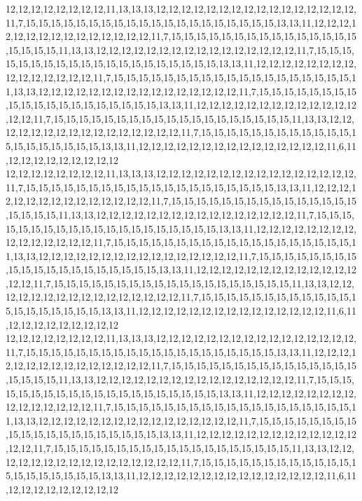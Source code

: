 12,12,12,12,12,12,12,12,11,13,13,13,12,12,12,12,12,12,12,12,12,12,12,12,12,12,12,12,11,7,15,15,15,15,15,15,15,15,15,15,15,15,15,15,15,15,15,15,15,15,13,13,11,12,12,12,12,12,12,12,12,12,12,12,12,12,12,12,11,7,15,15,15,15,15,15,15,15,15,15,15,15,15,15,15,15,15,15,15,11,13,13,12,12,12,12,12,12,12,12,12,12,12,12,12,12,12,12,11,7,15,15,15,15,15,15,15,15,15,15,15,15,15,15,15,15,15,15,15,15,13,13,11,12,12,12,12,12,12,12,12,12,12,12,12,12,12,12,11,7,15,15,15,15,15,15,15,15,15,15,15,15,15,15,15,15,15,15,15,11,13,13,12,12,12,12,12,12,12,12,12,12,12,12,12,12,12,12,11,7,15,15,15,15,15,15,15,15,15,15,15,15,15,15,15,15,15,15,15,15,13,13,11,12,12,12,12,12,12,12,12,12,12,12,12,12,12,12,11,7,15,15,15,15,15,15,15,15,15,15,15,15,15,15,15,15,15,15,15,11,13,13,12,12,12,12,12,12,12,12,12,12,12,12,12,12,12,12,11,7,15,15,15,15,15,15,15,15,15,15,15,15,15,15,15,15,15,15,15,15,13,13,11,12,12,12,12,12,12,12,12,12,12,12,12,12,12,12,11,6,11,12,12,12,12,12,12,12,12,12
12,12,12,12,12,12,12,12,11,13,13,13,12,12,12,12,12,12,12,12,12,12,12,12,12,12,12,12,11,7,15,15,15,15,15,15,15,15,15,15,15,15,15,15,15,15,15,15,15,15,13,13,11,12,12,12,12,12,12,12,12,12,12,12,12,12,12,12,11,7,15,15,15,15,15,15,15,15,15,15,15,15,15,15,15,15,15,15,15,11,13,13,12,12,12,12,12,12,12,12,12,12,12,12,12,12,12,12,11,7,15,15,15,15,15,15,15,15,15,15,15,15,15,15,15,15,15,15,15,15,13,13,11,12,12,12,12,12,12,12,12,12,12,12,12,12,12,12,11,7,15,15,15,15,15,15,15,15,15,15,15,15,15,15,15,15,15,15,15,11,13,13,12,12,12,12,12,12,12,12,12,12,12,12,12,12,12,12,11,7,15,15,15,15,15,15,15,15,15,15,15,15,15,15,15,15,15,15,15,15,13,13,11,12,12,12,12,12,12,12,12,12,12,12,12,12,12,12,11,7,15,15,15,15,15,15,15,15,15,15,15,15,15,15,15,15,15,15,15,11,13,13,12,12,12,12,12,12,12,12,12,12,12,12,12,12,12,12,11,7,15,15,15,15,15,15,15,15,15,15,15,15,15,15,15,15,15,15,15,15,13,13,11,12,12,12,12,12,12,12,12,12,12,12,12,12,12,12,11,6,11,12,12,12,12,12,12,12,12,12
12,12,12,12,12,12,12,12,11,13,13,13,12,12,12,12,12,12,12,12,12,12,12,12,12,12,12,12,11,7,15,15,15,15,15,15,15,15,15,15,15,15,15,15,15,15,15,15,15,15,13,13,11,12,12,12,12,12,12,12,12,12,12,12,12,12,12,12,11,7,15,15,15,15,15,15,15,15,15,15,15,15,15,15,15,15,15,15,15,11,13,13,12,12,12,12,12,12,12,12,12,12,12,12,12,12,12,12,11,7,15,15,15,15,15,15,15,15,15,15,15,15,15,15,15,15,15,15,15,15,13,13,11,12,12,12,12,12,12,12,12,12,12,12,12,12,12,12,11,7,15,15,15,15,15,15,15,15,15,15,15,15,15,15,15,15,15,15,15,11,13,13,12,12,12,12,12,12,12,12,12,12,12,12,12,12,12,12,11,7,15,15,15,15,15,15,15,15,15,15,15,15,15,15,15,15,15,15,15,15,13,13,11,12,12,12,12,12,12,12,12,12,12,12,12,12,12,12,11,7,15,15,15,15,15,15,15,15,15,15,15,15,15,15,15,15,15,15,15,11,13,13,12,12,12,12,12,12,12,12,12,12,12,12,12,12,12,12,11,7,15,15,15,15,15,15,15,15,15,15,15,15,15,15,15,15,15,15,15,15,13,13,11,12,12,12,12,12,12,12,12,12,12,12,12,12,12,12,11,6,11,12,12,12,12,12,12,12,12,12
